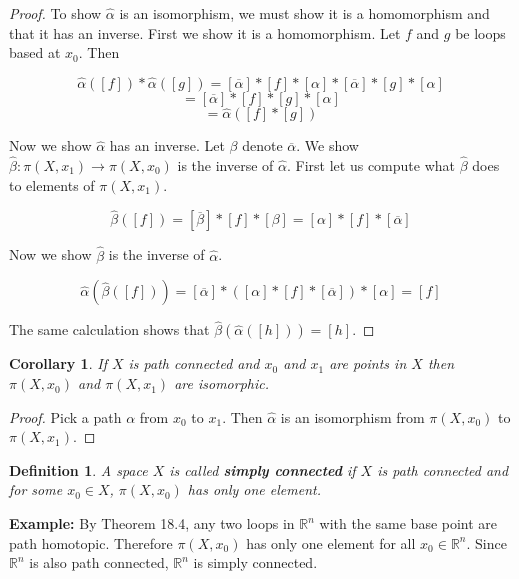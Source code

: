 \documentclass[a4paper]{article}
\newtheorem{definition}[theorem]{Definition}
\newtheorem{corollary}[theorem]{Corollary}
\numberwithin{theorem}{section}
\begin{document}
\begin{proof}
To show $\hat{\alpha}$ is an isomorphism, we must show it is a homomorphism and that it has an inverse. First we show it is a homomorphism. Let $f$ and $g$ be loops based at $x_0$. Then

$$ \hat{\alpha}([f]) \ast \hat{\alpha}([g]) = [\overline{\alpha}] \ast [f] \ast [\alpha] \ast [\overline{\alpha}] \ast [g] \ast [\alpha]  $$
$$ = [\overline{\alpha}] \ast [f] \ast [g] \ast [\alpha]  $$
$$ = \hat{\alpha}([f] \ast [g]) $$

Now we show $\hat{\alpha}$ has an inverse. Let $\beta$ denote $\overline{\alpha}$. We show $\hat{\beta}: \pi(X,x_1) \rightarrow \pi(X,x_0)$ is the inverse of $\hat{\alpha}$. First let us compute what $\hat{\beta}$ does to elements of $\pi(X,x_1)$.

$$ \hat{\beta}([f]) = [\overline{\beta}] \ast [f] \ast [\beta] = [\alpha] \ast [f] \ast [\overline{\alpha}] $$

Now we show $\hat{\beta}$ is the inverse of $\hat{\alpha}$.

$$ \hat{\alpha}(\hat{\beta}([f])) = [\overline{\alpha}] \ast ([\alpha] \ast [f] \ast [\overline{\alpha}]) \ast [\alpha] = [f] $$

The same calculation shows that $\hat{\beta}(\hat{\alpha}([h])) = [h]$.

\end{proof}

\begin{corollary}
If $X$ is path connected and $x_0$ and $x_1$ are points in $X$ then $\pi(X,x_0)$ and $\pi(X,x_1)$ are isomorphic.
\end{corollary}

\begin{proof}
Pick a path $\alpha$ from $x_0$ to $x_1$. Then $\hat{\alpha}$ is an isomorphism from $\pi(X,x_0)$ to $\pi(X,x_1)$.
\end{proof}

\begin{definition}
A space $X$ is called \textbf{simply connected} if $X$ is path connected and for some $x_0 \in X$, $\pi(X,x_0)$ has only one element.

\end{definition}

\textbf{Example:} By Theorem 18.4, any two loops in $\mathbb{R}^n$ with the same base point are path homotopic. Therefore $\pi(X,x_0)$ has only one element for all $x_0 \in \mathbb{R}^n$. Since $\mathbb{R}^n$ is also path connected, $\mathbb{R}^n$ is simply connected.
\end{document}
